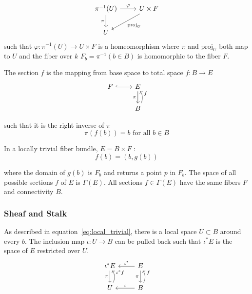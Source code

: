 \documentclass[../main.tex]{subfiles}
\begin{document}
\begin{equation}
    \label{eq:fiber_local_trivial}
    \begin{tikzcd}
        \pi^{-1}(U) \arrow[r, "\varphi"] \arrow[d, "\pi"'] & U \times F \arrow[ld, "\mathrm{proj}_U"] \\
        U                                                  &                                         
    \end{tikzcd}
\end{equation}
such that $\varphi: \pi^{-1}(U) \rightarrow U \times F$ is a homeomorphism where $\pi$ and $\mathrm{proj}_U$ both map to $U$ and the fiber over $k$ $F_b = \pi^{-1}({b \in B}) $ is homomorphic to the fiber $F$.

The section $f$ is the mapping from base space to total space $f: B\rightarrow E$ 
\begin{equation}
    \label{eq:section}
    \begin{tikzcd}
        F \arrow[r, hook] & E \arrow[d, "\pi"']           \\
        & B \arrow[u, "f"', bend right]
    \end{tikzcd}
\end{equation}

such that it is the right inverse of $\pi$
\begin{equation}
    \label{eq:section_domain}
    \pi(f(b)) = b \text{ for all } b \in B 
\end{equation}

In a locally trivial fiber bundle, $E = B \times F$ \cite{rowlandFiberBundle,FiberBundle2020}:
\begin{equation}
    \label{eq:section_return}
f(b) = (b, g(b))
\end{equation}

where the domain of $g(b)$ is $F_b$ and returns a point $p$ in $F_b$. The space of all possible sections $f$ of $E$ is $\Gamma(E)$. All sections $f \in \Gamma(E)$ have the same fibers $F$ and connectivity $B$. 

\subsubsection{Sheaf and Stalk}
As described in equation~\ref{eq:local_trivial}, there is a local space $U \subset B$ around every $b$. The inclusion map $\iota: U \rightarrow B$ can be pulled back such that $\iota^{*}E$ is the space of $E$ restricted over $U$. 
\begin{equation}
    \label{eq:sheaf}
    \begin{tikzcd}
        \iota^*E \arrow[d, "\pi"']           & E \arrow[d, "\pi"'] \arrow[l, "\iota^*"']         \\
        U \arrow[u, "\iota^*f"', bend right] & B \arrow[u, "f"', bend right] \arrow[l, "\iota"']
        \end{tikzcd}
\end{equation}
\end{document}
